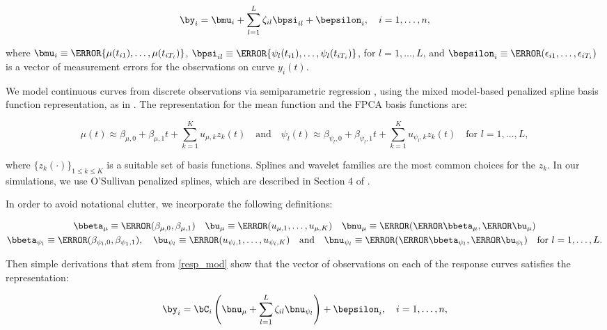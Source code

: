 \documentclass[12pt]{article}
\def\betamu{\bbeta_\mu}
\def\umu{\bu_\mu}
\def\numu{\bnu_\mu}
\newcommand\betapsi[1]{\bbeta_{\psi_{#1}}}
\newcommand\upsi[1]{\bu_{\psi_{#1}}}
\newcommand\nupsi[1]{\bnu_{\psi_{#1}}}
\theoremstyle{plain}
\theoremstyle{definition}
\theoremstyle{remark}
\begin{document}
\begin{equation}
	\by_i = \bmu_i + \sum_{l=1}^L \zeta_{il} \bpsi_{il} + \bepsilon_{i}, \quad i = 1, \dots, n,
\label{resp_mod}
\end{equation}

\noindent where $\bmu_i \equiv \T{\{ \mu (t_{i1}), \dots, \mu (t_{iT_i}) \}}$,
$\bpsi_{il} \equiv \T{\{ \psi_l (t_{i1}), \dots, \psi_l (t_{iT_i}) \}}$, for $l = 1, \dots, L$, and
$\bepsilon_{i} \equiv \T{(\epsilon_{i1}, \dots, \epsilon_{iT_i})}$ is a vector of measurement errors
for the observations on curve $y_i (t)$.

We model continuous curves from discrete observations via semiparametric regression \cite{ruppert03, ruppert09},
using the mixed model-based penalized spline basis function representation, as in . The
representation for the mean function and the FPCA basis functions are:

\[
	\mu (t) \approx \beta_{\mu, 0} + \beta_{\mu, 1} t + \sum_{k=1}^K u_{\mu, k} z_k (t) \quad
	\text{and} \quad
	\psi_l (t) \approx \beta_{\psi_l, 0} + \beta_{\psi_l, 1} t + \sum_{k=1}^K u_{\psi_l, k} z_k (t) \quad
	\text{for $l = 1, \dots, L$},
\]

\noindent where $\{ z_k (\cdot) \}_{1 \le k \le K}$ is a suitable set of
basis functions. Splines and wavelet families are the most common choices for the $z_k$. In our simulations, we
use O'Sullivan penalized splines, which are described in Section 4 of .

In order to avoid notational clutter, we incorporate the following definitions:

\[
\begin{gathered}
	\betamu \equiv \T{(\beta_{\mu, 0}, \beta_{\mu, 1})} \quad
		\umu \equiv \T{(u_{\mu, 1}, \dots, u_{\mu, K})} \quad
		\numu \equiv \T{(\T{\betamu}, \T{\umu})} \\
	\betapsi{l} \equiv \T{(\beta_{\psi_l, 0}, \beta_{\psi_1, 1})}, \quad
		\upsi{l} \equiv \T{(u_{\psi_l, 1}, \dots, u_{\psi_l, K})} \quad
		\text{and} \quad
		\nupsi{l} \equiv \T{(\T{\betapsi{l}}, \T{\upsi{l}})} \quad
		\text{for $l = 1, \dots, L$}.
\end{gathered}
\]

\noindent Then simple derivations that stem from \eqref{resp_mod} show that the vector of observations on
each of the response curves satisfies the representation:

\[
	\by_i = \bC_i \left(
		\numu + \sum_{l=1}^L \zeta_{il} \nupsi{l}
	\right) + \bepsilon_{i}, \quad i = 1, \dots, n,
\]
\end{document}
